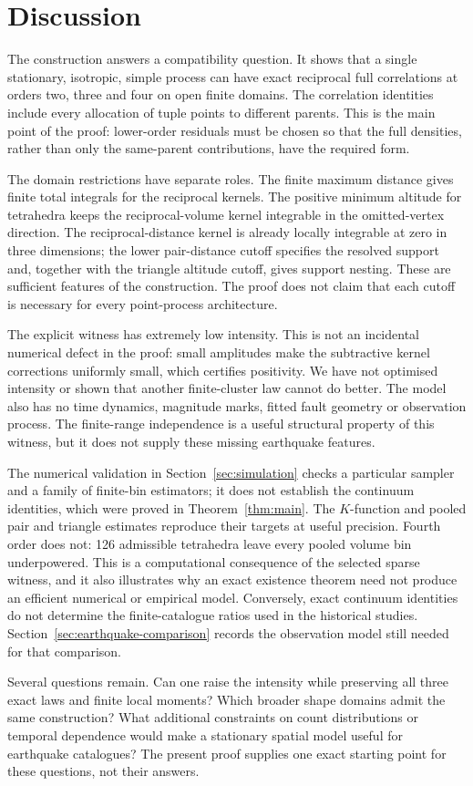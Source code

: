 \section{Discussion}
\label{sec:discussion}

The construction answers a compatibility question. It shows that a single stationary, isotropic, simple process can have exact reciprocal full correlations at orders two, three and four on open finite domains. The correlation identities include every allocation of tuple points to different parents. This is the main point of the proof: lower-order residuals must be chosen so that the full densities, rather than only the same-parent contributions, have the required form.

The domain restrictions have separate roles. The finite maximum distance gives finite total integrals for the reciprocal kernels. The positive minimum altitude for tetrahedra keeps the reciprocal-volume kernel integrable in the omitted-vertex direction. The reciprocal-distance kernel is already locally integrable at zero in three dimensions; the lower pair-distance cutoff specifies the resolved support and, together with the triangle altitude cutoff, gives support nesting. These are sufficient features of the construction. The proof does not claim that each cutoff is necessary for every point-process architecture.

The explicit witness has extremely low intensity. This is not an incidental numerical defect in the proof: small amplitudes make the subtractive kernel corrections uniformly small, which certifies positivity. We have not optimised intensity or shown that another finite-cluster law cannot do better. The model also has no time dynamics, magnitude marks, fitted fault geometry or observation process. The finite-range independence is a useful structural property of this witness, but it does not supply these missing earthquake features.

The numerical validation in Section~\ref{sec:simulation} checks a particular sampler and a family of finite-bin estimators; it does not establish the continuum identities, which were proved in Theorem~\ref{thm:main}. The $K$-function and pooled pair and triangle estimates reproduce their targets at useful precision. Fourth order does not: 126 admissible tetrahedra leave every pooled volume bin underpowered. This is a computational consequence of the selected sparse witness, and it also illustrates why an exact existence theorem need not produce an efficient numerical or empirical model. Conversely, exact continuum identities do not determine the finite-catalogue ratios used in the historical studies. Section~\ref{sec:earthquake-comparison} records the observation model still needed for that comparison.

Several questions remain. Can one raise the intensity while preserving all three exact laws and finite local moments? Which broader shape domains admit the same construction? What additional constraints on count distributions or temporal dependence would make a stationary spatial model useful for earthquake catalogues? The present proof supplies one exact starting point for these questions, not their answers.
